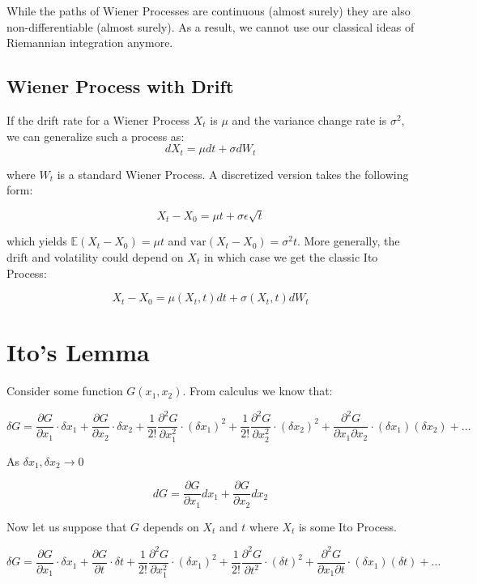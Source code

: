 \documentclass[11pt,]{article}
\begin{document}
While the paths of Wiener Processes are continuous (almost surely) they
are also non-differentiable (almost surely). As a result, we cannot use
our classical ideas of Riemannian integration anymore.

\subsection{Wiener Process with Drift}\label{wiener-process-with-drift}

If the drift rate for a Wiener Process \(X_t\) is \(\mu\) and the
variance change rate is \(\sigma^2\), we can generalize such a process
as: \[dX_t = \mu dt + \sigma dW_t\]

where \(W_t\) is a standard Wiener Process. A discretized version takes
the following form:

\[X_t-X_0 = \mu t+\sigma \epsilon \sqrt{t}\]

which yields \(\mathbb{E}(X_t-X_0)=\mu t\) and
\(\text{var}(X_t-X_0) = \sigma^2 t\). More generally, the drift and
volatility could depend on \(X_t\) in which case we get the classic Ito
Process:

\[X_t-X_0 = \mu(X_t, t) dt+ \sigma(X_t, t)dW_t\]

\section{Ito's Lemma}\label{itos-lemma}

Consider some function \(G(x_1, x_2)\). From calculus we know that:

\[\delta G = \frac{\partial G}{\partial x_1}\cdot \delta x_1 +
\frac{\partial G}{\partial x_2}\cdot \delta x_2 + 
\frac{1}{2!}\frac{\partial^2 G}{\partial x_1^2}\cdot (\delta x_1)^2 +
\frac{1}{2!}\frac{\partial^2 G}{\partial x_2^2}\cdot (\delta x_2)^2 +
\frac{\partial^2 G}{\partial x_1 \partial x_2}\cdot (\delta x_1)(\delta x_2) + \hdots
\]

As \(\delta x_1, \delta x_2\to 0\)

\[dG = \frac{\partial G}{\partial x_1}dx_1 + \frac{\partial G}{\partial x_2}dx_2\]

Now let us suppose that \(G\) depends on \(X_t\) and \(t\) where \(X_t\)
is some Ito Process.

\[\delta G = \frac{\partial G}{\partial x_1}\cdot \delta x_1 +
\frac{\partial G}{\partial t}\cdot \delta t + 
\frac{1}{2!}\frac{\partial^2 G}{\partial x_1^2}\cdot (\delta x_1)^2 +
\frac{1}{2!}\frac{\partial^2 G}{\partial t^2}\cdot (\delta t)^2 +
\frac{\partial^2 G}{\partial x_1 \partial t}\cdot (\delta x_1)(\delta t) + \hdots
\]
\end{document}
